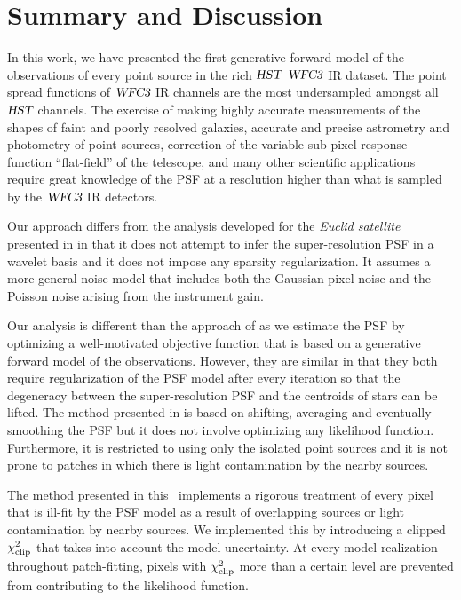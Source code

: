 \section{Summary and Discussion}\label{sec:hstsummary}

In this work, we have presented the first generative forward model of the observations of every point source in the rich ${\textsl{HST}}$ ${\textsl{WFC3}}$ IR dataset. 
The point spread functions of ${\textsl{WFC3}}$ IR channels are the most undersampled amongst all ${\textsl{HST}}$ channels. 
The exercise of making highly accurate measurements of the shapes of faint and poorly resolved galaxies, accurate and precise astrometry and photometry of point sources, 
correction of the variable sub-pixel response function ``flat-field'' of the telescope, and many other scientific applications require great knowledge of 
the PSF at a resolution higher than what is sampled by the ${\textsl{WFC3}}$ IR detectors. 

Our approach differs from the analysis developed for the \emph{Euclid satellite} presented in \citet{ngole,ngole2} in that it does not attempt to infer the super-resolution PSF in a wavelet basis and it does not impose any sparsity regularization. It assumes a more general noise model that includes both the Gaussian pixel noise and the Poisson noise arising from the instrument gain.

Our analysis is different than the approach of \citet{anderson2000} as we estimate the PSF by optimizing a well-motivated objective function 
that is based on a generative forward model of the observations. However, they are similar in that they both require regularization of the PSF model after every iteration so that the degeneracy between the super-resolution PSF and the centroids of stars can be lifted. 
The method presented in \citet{anderson2000} is based on shifting, averaging and eventually smoothing the PSF but it does not involve optimizing any likelihood function.
Furthermore, it is restricted to using only the isolated point sources and it is not prone to patches in which there is light contamination by the nearby sources. 

The method presented in this \paper\ implements a rigorous treatment of every pixel that is ill-fit by the PSF model as a result of overlapping sources or light contamination by nearby sources. We implemented this by introducing a clipped $\chi^{2}_{\rm clip}$ that takes into account the model uncertainty. At every model realization throughout patch-fitting, pixels with $\chi^{2}_{\rm clip}$ more than a certain level are prevented from contributing to the likelihood function.

